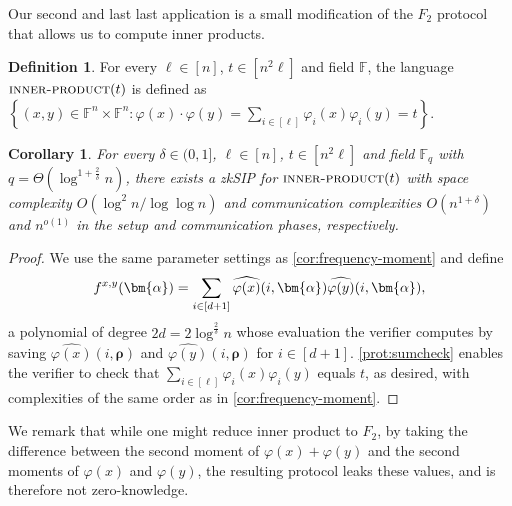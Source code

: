 \documentclass[a4paper,UKenglish,cleveref, autoref, thm-restate]{lipics-v2021}
\newtheorem{corollary}[theorem]{Corollary}
\theoremstyle{definition}
\newtheorem{definition}[theorem]{Definition}
\newcommand{\zksip}{\textrm{zkSIP}}
\newcommand{\field}{\mathbb{F}}
\renewcommand{\set}[1]{\left\{#1\right\}}
\newcommand{\innerproductproblem}{\normalfont\textsc{inner-product}\xspace}
\newcommand{\degree}{d}
\newcommand{\fieldsize}{q}
\newcommand{\fingerprinttuple}{\bm{\rho}}
\def\fe#1{
    \ifnum#1=1
        \alpha
    \else
    \ifnum#1=2
        \beta
    \else
    \ifnum#1=3
        \gamma
    \fi\fi\fi
}
\begin{document}
Our second and last last application is a small modification of the $F_2$ protocol that allows us to compute inner products.
\begin{definition}
    \label{def:inner-product}
    For every $\ell \in [n]$, $t \in [n^2 \ell]$ and field $\field$, the language $\innerproductproblem(t)$ is defined as $\set{(x,y) \in \field^n \times \field^n : \varphi(x) \cdot \varphi(y) = \sum_{i \in [\ell]} \varphi_i(x) \varphi_i(y) = t}$.
\end{definition}

\begin{corollary}
    \label{cor:inner-product}
    For every $\delta \in (0, 1]$, $\ell \in [n]$, $t \in [n^2 \ell]$ and field $\field_\fieldsize$ with $\fieldsize = \Theta\left(\log^{1 + \frac{2}{\delta}} n\right)$, there exists a \zksip{} for $\innerproductproblem(t)$ with space complexity $O(\log^2 n / \log\log n)$ and communication complexities $O(n^{1 + \delta})$ and $n^{o(1)}$ in the setup and communication phases, respectively.
\end{corollary}
\begin{proof}
    We use the same parameter settings as \cref{cor:frequency-moment} and define
    \begin{equation*}
        f^{x,y}(\bm{\fe1}) = \sum_{i \in [\degree + 1]} \widehat{\varphi(x)}(i, \bm{\fe1}) \widehat{\varphi(y)}(i, \bm{\fe1}),
    \end{equation*}
    a polynomial of degree $2\degree = 2\log^{\frac{2}{\delta}} n$ whose evaluation the verifier computes by saving $\widehat{\varphi(x)}(i,\fingerprinttuple)$ and $\widehat{\varphi(y)}(i,\fingerprinttuple)$ for $i \in [\degree + 1]$. \cref{prot:sumcheck} enables the verifier to check that $\sum_{i \in [\ell]} \varphi_i(x) \varphi_i(y)$ equals $t$, as desired, with complexities of the same order as in \cref{cor:frequency-moment}.
\end{proof}

We remark that while one might reduce inner product to $F_2$, by taking the difference between the second moment of $\varphi(x) + \varphi(y)$ and the second moments of $\varphi(x)$ and $\varphi(y)$, the resulting protocol leaks these values, and is therefore not zero-knowledge.
    
\end{document}
